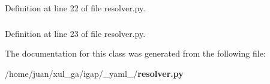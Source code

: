 Definition at line 22 of file resolver.py.
\subsubsection{}\label{class__yaml___1_1resolver_1_1BaseResolver_53b3109750a3095877d1ac02f9452ec7}




Definition at line 23 of file resolver.py.

The documentation for this class was generated from the following file:\begin{CompactItemize}
\item 
/home/juan/xul\_\-ga/igap/\_\-yaml\_\-/{\bf resolver.py}\end{CompactItemize}
